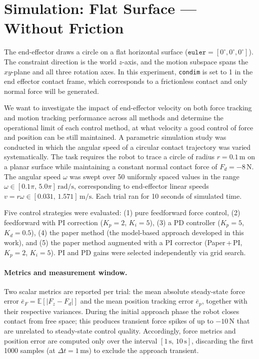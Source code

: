 \documentclass[
	german,%
	accentcolor=9c,%
	ruledheaders=section,%
	class=report,%
	thesis={type=bachelor},%
	fontsize=11pt,%
	parskip=half-,%
	custommargins=true,%
	marginpar=false,%
]{tudapub}
\begin{document}
\section{Simulation: Flat Surface — Without Friction}

The end-effector draws a circle on a flat horizontal surface
(\(\texttt{euler} = [0^\circ, 0^\circ, 0^\circ]\)).
The constraint direction is the world \(z\)-axis, and the motion subspace
spans the \(xy\)-plane and all three rotation axes. In this experiment, \texttt{condim} is set to 1 in the end effector contact frame, which corresponds to a frictionless contact and only normal force will be generated.

We want to investigate the impact of end-effector velocity on both force tracking and 
motion tracking performance across all methods and determine the operational limit of each control method, at what velocity a good control of force and position can be still maintained. A parametric simulation study was conducted in which the angular speed of a circular contact
trajectory was varied systematically. 
The task requires the robot to trace a circle of radius $r = 0.1\,\mathrm{m}$
on a planar surface while maintaining a constant normal contact force of
$F_d = -8\,\mathrm{N}$.
The angular speed $\omega$ was swept over 50 uniformly spaced values in the
range $\omega \in [0.1\pi,\,5.0\pi]\,\mathrm{rad/s}$, corresponding to
end-effector linear speeds
$v = r\omega \in [0.031,\,1.571]\,\mathrm{m/s}$.
Each trial ran for 10 seconds of simulated time. 

Five control strategies were evaluated:
(1) pure feedforward force control,
(2) feedforward with PI correction ($K_p = 2$, $K_i = 5$),
(3) a PD controller ($K_p = 5$, $K_d = 0.5$),
(4) the paper method (the model-based approach developed in this work), and
(5) the paper method augmented with a PI corrector (Paper\,+\,PI,
$K_p = 2$, $K_i = 5$).
PI and PD gains were selected independently via grid search.

\paragraph{Metrics and measurement window.}
Two scalar metrics are reported per trial:
the mean absolute steady-state force error
$\bar{e}_F = \mathbb{E}[|F_z - F_d|]$
and the mean position tracking error $\bar{e}_p$,
together with their respective variances.
During the initial approach phase the robot closes contact from free space;
this produces transient force spikes of up to $-10\,\mathrm{N}$ that are
unrelated to steady-state control quality.
Accordingly, force metrics and position error are computed only over the interval
$[1\,\mathrm{s},\,10\,\mathrm{s}]$, discarding the first 1000 samples
(at $\Delta t = 1\,\mathrm{ms}$) to exclude the approach transient.
\end{document}
